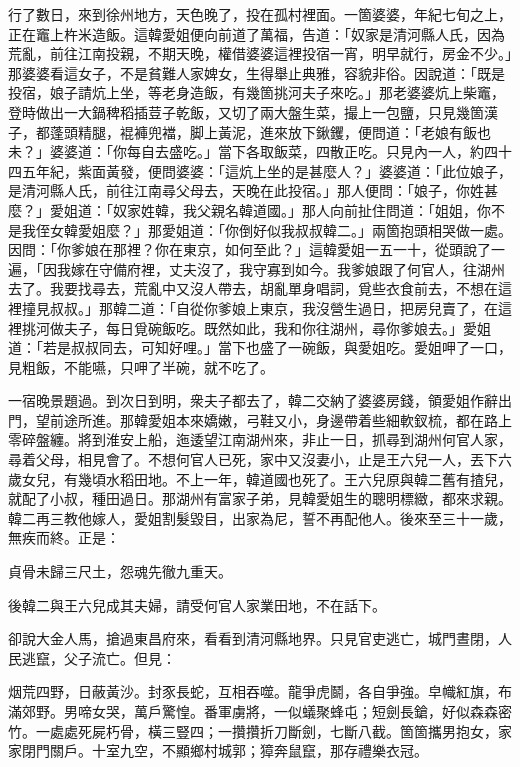 行了數日，來到徐州地方，天色晚了，投在孤村裡面。一箇婆婆，年紀七旬之上，正在竈上杵米造飯。這韓愛姐便向前道了萬福，告道：「奴家是清河縣人氏，因為荒亂，前往江南投親，不期天晚，權借婆婆這裡投宿一宵，明早就行，房金不少。」那婆婆看這女子，不是貧難人家婢女，生得舉止典雅，容貌非俗。因說道：「既是投宿，娘子請炕上坐，等老身造飯，有幾箇挑河夫子來吃。」那老婆婆炕上柴竈，登時做出一大鍋稗稻插荳子乾飯，又切了兩大盤生菜，撮上一包鹽，只見幾箇漢子，都蓬頭精腿，裩褲兜襠，脚上黃泥，進來放下鍬钁，便問道：「老娘有飯也未？」婆婆道：「你每自去盛吃。」當下各取飯菜，四散正吃。只見內一人，約四十四五年紀，紫面黃發，便問婆婆：「這炕上坐的是甚麼人？」婆婆道：「此位娘子，是清河縣人氏，前往江南尋父母去，天晚在此投宿。」那人便問：「娘子，你姓甚麼？」愛姐道：「奴家姓韓，我父親名韓道國。」那人向前扯住問道：「姐姐，你不是我侄女韓愛姐麼？」那愛姐道：「你倒好似我叔叔韓二。」兩箇抱頭相哭做一處。因問：「你爹娘在那裡？你在東京，如何至此？」這韓愛姐一五一十，從頭說了一遍，「因我嫁在守備府裡，丈夫沒了，我守寡到如今。我爹娘跟了何官人，往湖州去了。我要找尋去，荒亂中又沒人帶去，胡亂單身唱詞，覓些衣食前去，不想在這裡撞見叔叔。」那韓二道：「自從你爹娘上東京，我沒營生過日，把房兒賣了，在這裡挑河做夫子，每日覓碗飯吃。既然如此，我和你往湖州，尋你爹娘去。」愛姐道：「若是叔叔同去，可知好哩。」當下也盛了一碗飯，與愛姐吃。愛姐呷了一口，見粗飯，不能嚥，只呷了半碗，就不吃了。

一宿晚景題過。到次日到明，衆夫子都去了，韓二交納了婆婆房錢，領愛姐作辭出門，望前途所進。那韓愛姐本來嬌嫩，弓鞋又小，身邊帶着些細軟釵梳，都在路上零碎盤纏。將到淮安上船，迤逶望江南湖州來，非止一日，抓尋到湖州何官人家，尋着父母，相見會了。不想何官人已死，家中又沒妻小，止是王六兒一人，丟下六歲女兒，有幾頃水稻田地。不上一年，韓道國也死了。王六兒原與韓二舊有揸兒，就配了小叔，種田過日。{}那湖州有富家子弟，見韓愛姐生的聰明標緻，都來求親。韓二再三教他嫁人，愛姐割髮毀目，出家為尼，誓不再配他人。{}後來至三十一歲，無疾而終。正是：

\begin{myquote}
貞骨未歸三尺土，怨魂先徹九重天。
\end{myquote}

後韓二與王六兒成其夫婦，請受何官人家業田地，不在話下。

卻說大金人馬，搶過東昌府來，看看到清河縣地界。只見官吏逃亡，城門晝閉，人民逃竄，父子流亡。但見：

\begin{myquote}
烟荒四野，日蔽黃沙。封豕長蛇，互相吞噬。龍爭虎鬬，各自爭強。皁幟紅旗，布滿郊野。男啼女哭，萬戶驚惶。番軍虜將，一似蟻聚蜂屯；短劍長鎗，好似森森密竹。一處處死屍朽骨，橫三豎四；一攢攢折刀斷劍，七斷八截。箇箇攜男抱女，家家閉門關戶。十室九空，不顯鄉村城郭；獐奔鼠竄，那存禮樂衣冠。
\end{myquote}


